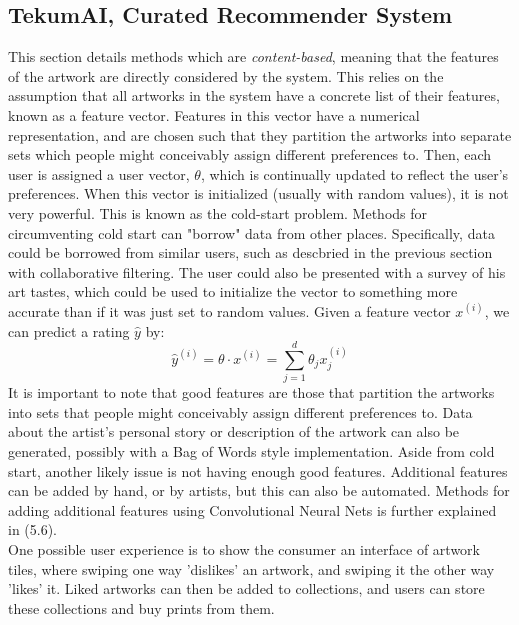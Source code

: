 \documentclass[fontsize=12pt]{scrartcl} %
\begin{document}
\subsection{TekumAI, Curated Recommender System}
 This section details methods which are \textit{content-based}, meaning that the features of the artwork are directly considered by the system. This relies on the assumption that all artworks in the system have a concrete list of their features, known as a feature vector. Features in this vector have a numerical representation, and are chosen such that they partition the artworks into separate sets which people might conceivably assign different preferences to. Then, each user is assigned a user vector, $\theta$, which is continually updated to reflect the user's preferences. When this vector is initialized (usually with random values), it is not very powerful. This is known as the cold-start problem. Methods for circumventing cold start can "borrow" data from other places. Specifically, data could be borrowed from similar users, such as descbried in the previous section with collaborative filtering. The user could also be presented with a survey of his art tastes, which could be used to initialize the vector to something more accurate than if it was just set to random values. Given a feature vector $x^{(i)}$, we can predict a rating $\hat{y}$ by:
 $$ \hat{y}^{(i)} = \theta \cdot x^{(i)} = \sum_{j=1}^d \theta_jx^{(i)}_j $$
It is important to note that good features are those that partition the artworks into sets that people might
conceivably assign different preferences to. Data about the artist's personal story or description of the artwork can also be generated, possibly with a Bag of Words style implementation. Aside from cold start, another likely issue is not having enough good features. Additional features can be added by hand, or by artists, but this can also be automated. Methods for adding additional features using Convolutional Neural Nets is further explained in (5.6).\\
One possible user experience is to show the consumer an interface of artwork tiles, where swiping one way 'dislikes' an artwork, and swiping it the other way 'likes' it. Liked artworks can then be added to collections, and users can store these collections and buy prints from them.
\end{document}
